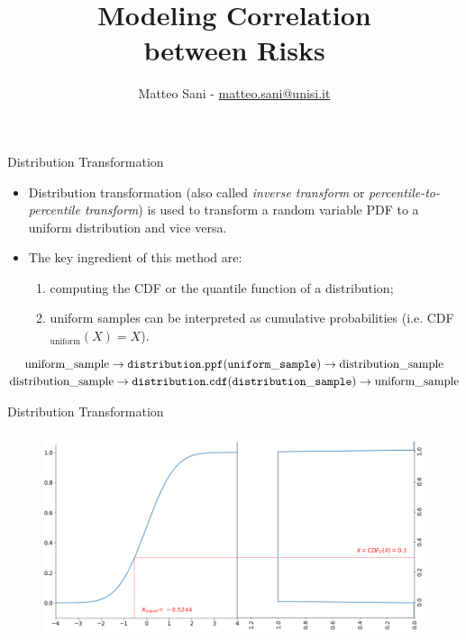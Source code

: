 \documentclass{beamer}
\title{Modeling Correlation \\ \vspace{0.25cm} between Risks}
\author{Matteo Sani - \href{mailto:matteo.sani@unisi.it}{matteo.sani@unisi.it}}
\begin{document}
\begin{frame}[plain]
	\maketitle
\end{frame}

\begin{frame}{Distribution Transformation}
  \begin{itemize}
  \item Distribution transformation (also called \emph{inverse transform} or \emph{percentile-to-percentile transform}) is used to transform a random variable PDF to a uniform distribution and vice versa.
  \item The key ingredient of this method are:
    \begin{enumerate}
      \item computing the CDF or the quantile function of a distribution;
      \item uniform samples can be interpreted as cumulative probabilities (i.e.  CDF$_{\textrm{uniform}}(X)=X$).
    \end{enumerate}
  \end{itemize}

  \begin{equation*}
    \begin{gathered}
      \textrm{uniform\_sample} \rightarrow \tt{distribution.ppf(uniform\_sample)} \rightarrow \textrm{distribution\_sample}\\
      \textrm{distribution\_sample} \rightarrow \tt{distribution.cdf(distribution\_sample)} \rightarrow \textrm{uniform\_sample}
    \end{gathered}
  \end{equation*}
\end{frame}

\begin{frame}{Distribution Transformation}
  \begin{figure}[h]
    \begin{center}
    \includegraphics[width=0.7\linewidth]{ppf_transform}
    \end{center}
  \end{figure}    
\end{frame}
\end{document}
